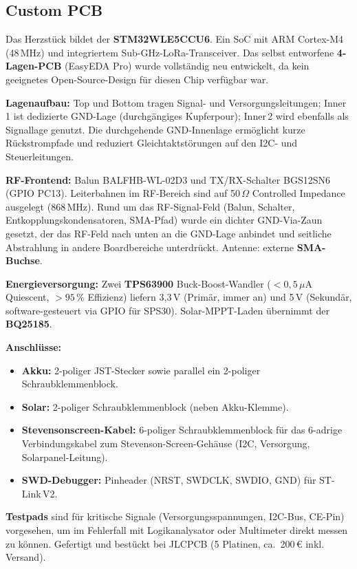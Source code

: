 \documentclass[11pt,a4paper]{scrartcl}
\begin{document}
\subsection*{Custom PCB}

Das Herzstück bildet der \textbf{STM32WLE5CCU6}. Ein SoC mit ARM Cortex-M4 (48\,MHz) und integriertem Sub-GHz-LoRa-Transceiver. Das selbst entworfene \textbf{4-Lagen-PCB} (EasyEDA Pro) wurde vollständig neu entwickelt, da kein geeignetes Open-Source-Design für diesen Chip verfügbar war.

\textbf{Lagenaufbau:} Top und Bottom tragen Signal- und Versorgungsleitungen; Inner\,1 ist dedizierte GND-Lage (durchgängiges Kupferpour); Inner\,2 wird ebenfalls als Signallage genutzt. Die durchgehende GND-Innenlage ermöglicht kurze Rückstrompfade und reduziert Gleichtaktstörungen auf den I2C- und Steuerleitungen.

\textbf{RF-Frontend:} Balun BALFHB-WL-02D3 und TX/RX-Schalter BGS12SN6 (GPIO PC13). Leiterbahnen im RF-Bereich sind auf 50\,$\Omega$ Controlled Impedance ausgelegt (868\,MHz). Rund um das RF-Signal-Feld (Balun, Schalter, Entkopplungskondensatoren, SMA-Pfad) wurde ein dichter GND-Via-Zaun gesetzt, der das RF-Feld nach unten an die GND-Lage anbindet und seitliche Abstrahlung in andere Boardbereiche unterdrückt. Antenne: externe \textbf{SMA-Buchse}.

\textbf{Energieversorgung:} Zwei \textbf{TPS63900} Buck-Boost-Wandler ($<0{,}5\,\mu\text{A}$ Quiescent, $>95\,\%$ Effizienz) liefern 3,3\,V (Primär, immer an) und 5\,V (Sekundär, software-gesteuert via GPIO für SPS30). Solar-MPPT-Laden übernimmt der \textbf{BQ25185}.

\textbf{Anschlüsse:}
\begin{itemize}
  \item \textbf{Akku:} 2-poliger JST-Stecker sowie parallel ein 2-poliger Schraubklemmenblock.
  \item \textbf{Solar:} 2-poliger Schraubklemmenblock (neben Akku-Klemme).
  \item \textbf{Stevensonscreen-Kabel:} 6-poliger Schraubklemmenblock für das 6-adrige Verbindungskabel zum Stevenson-Screen-Gehäuse (I2C, Versorgung, Solarpanel-Leitung).
  \item \textbf{SWD-Debugger:} Pinheader (NRST, SWDCLK, SWDIO, GND) für ST-Link\,V2.
\end{itemize}

\textbf{Testpads} sind für kritische Signale (Versorgungsspannungen, I2C-Bus, CE-Pin) vorgesehen, um im Fehlerfall mit Logikanalysator oder Multimeter direkt messen zu können. Gefertigt und bestückt bei JLCPCB (5 Platinen, ca.~200\,€ inkl. Versand).
\end{document}

